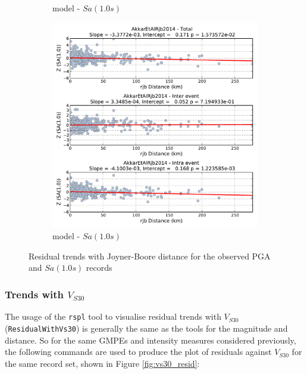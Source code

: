 \begin{figure}[htb]
\begin{subfigure}[b]{0.49\textwidth}
      \caption{\textcite{boore2008} model - $Sa \left( {1.0 s} \right)$}
      \label{fig:sa1_dist_ba2008}
  \end{subfigure}
      \begin{subfigure}[b]{0.49\textwidth}
      \includegraphics[width=\textwidth]{./figures/residuals/Akkar2014_Distance_Sa1.pdf}
     \caption{\textcite{Akkar_etal2014} model - $Sa \left( {1.0 s} \right)$}
      \label{fig:sa1_dist_akkar2014}
  \end{subfigure}
  \caption{Residual trends with Joyner-Boore distance for the observed PGA and $Sa \left( {1.0 s} \right)$ records}
  \label{fig:dist_resid}
\end{figure}

\subsubsection{Trends with $V_{S30}$}

The usage of the \verb=rspl= tool to visualise residual trends with $V_{S30}$ (\verb=ResidualWithVs30=) is generally the same as the tools for the magnitude and distance. So for the same GMPEs and intensity measures considered previously, the following commands are used to produce the plot of residuals against $V_{S30}$ for the same record set, shown in Figure \ref{fig:vs30_resid}:
 
